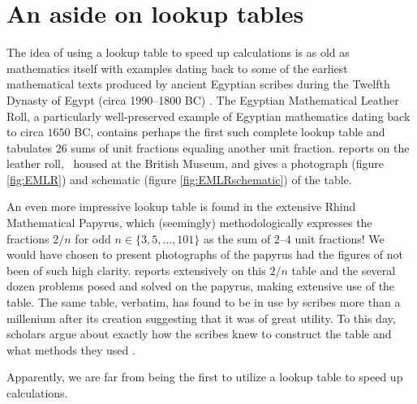 \section{An aside on lookup tables}
The idea of using a lookup table to speed up calculations is as old as mathematics itself with examples dating back to some of the earliest mathematical texts produced by ancient Egyptian scribes during the Twelfth Dynasty of Egypt (circa 1990--1800 BC) \citep[p. 1, footnote 4]{Neugebauer45}. The Egyptian Mathematical Leather Roll, a particularly well-preserved example of Egyptian mathematics dating back to circa $1650$ BC, contains perhaps the first such complete lookup table and tabulates 26 sums of unit fractions equaling another unit fraction. \citet{Glanville27} reports on the leather roll,\footnotemark~ housed at the British Museum, and gives a photograph (figure \ref{fig:EMLR}) and schematic (figure \ref{fig:EMLRschematic}) of the table.


An even more impressive lookup table is found in the extensive Rhind Mathematical Papyrus, which (seemingly) methodologically expresses the fractions $2/n$ for odd $n \in \lbrace 3, 5, \dots, 101 \rbrace$ as the sum of 2--4 unit fractions! We would have chosen to present photographs of the papyrus had the figures of \citep{Glanville27} not been of such high clarity. \citet{Gillings82} reports extensively on this $2/n$ table and the several dozen problems posed and solved on the papyrus, making extensive use of the table. The same table, verbatim, has found to be in use by scribes more than a millenium after its creation suggesting that it was of great utility. To this day, scholars argue about exactly how the scribes knew to construct the table and what methods they used \citep{Gillings74, Abdulaziz08}.

Apparently, we are far from being the first to utilize a lookup table to speed up calculations.\footnotemark



